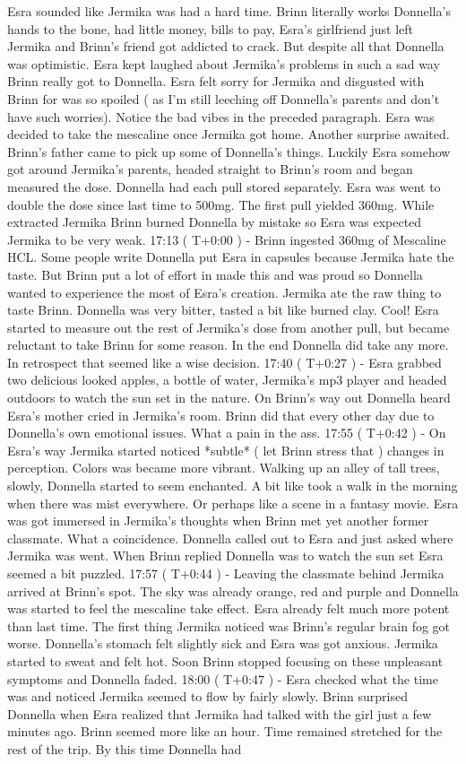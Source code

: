 \documentclass[12pt]{book}
\begin{document}
Esra sounded like Jermika was had a hard time. Brinn literally works Donnella's hands to the bone, had little money, bills to pay, Esra's girlfriend just left Jermika and Brinn's friend got addicted to crack. But despite all that Donnella was optimistic. Esra kept laughed about Jermika's problems in such a sad way Brinn really got to Donnella. Esra felt sorry for Jermika and disgusted with Brinn for was so spoiled ( as I'm still leeching off Donnella's parents and don't have such worries). Notice the bad vibes in the preceded paragraph. Esra was decided to take the mescaline once Jermika got home. Another surprise awaited. Brinn's father came to pick up some of Donnella's things. Luckily Esra somehow got around Jermika's parents, headed straight to Brinn's room and began measured the dose. Donnella had each pull stored separately. Esra was went to double the dose since last time to 500mg. The first pull yielded 360mg. While extracted Jermika Brinn burned Donnella by mistake so Esra was expected Jermika to be very weak. 17:13 ( T+0:00 ) - Brinn ingested 360mg of Mescaline HCL. Some people write Donnella put Esra in capsules because Jermika hate the taste. But Brinn put a lot of effort in made this and was proud so Donnella wanted to experience the most of Esra's creation. Jermika ate the raw thing to taste Brinn. Donnella was very bitter, tasted a bit like burned clay. Cool! Esra started to measure out the rest of Jermika's dose from another pull, but became reluctant to take Brinn for some reason. In the end Donnella did take any more. In retrospect that seemed like a wise decision. 17:40 ( T+0:27 ) - Esra grabbed two delicious looked apples, a bottle of water, Jermika's mp3 player and headed outdoors to watch the sun set in the nature. On Brinn's way out Donnella heard Esra's mother cried in Jermika's room. Brinn did that every other day due to Donnella's own emotional issues. What a pain in the ass. 17:55 ( T+0:42 ) - On Esra's way Jermika started noticed *subtle* ( let Brinn stress that ) changes in perception. Colors was became more vibrant. Walking up an alley of tall trees, slowly, Donnella started to seem enchanted. A bit like took a walk in the morning when there was mist everywhere. Or perhaps like a scene in a fantasy movie. Esra was got immersed in Jermika's thoughts when Brinn met yet another former classmate. What a coincidence. Donnella called out to Esra and just asked where Jermika was went. When Brinn replied Donnella was to watch the sun set Esra seemed a bit puzzled. 17:57 ( T+0:44 ) - Leaving the classmate behind Jermika arrived at Brinn's spot. The sky was already orange, red and purple and Donnella was started to feel the mescaline take effect. Esra already felt much more potent than last time. The first thing Jermika noticed was Brinn's regular brain fog got worse. Donnella's stomach felt slightly sick and Esra was got anxious. Jermika started to sweat and felt hot. Soon Brinn stopped focusing on these unpleasant symptoms and Donnella faded. 18:00 ( T+0:47 ) - Esra checked what the time was and noticed Jermika seemed to flow by fairly slowly. Brinn surprised Donnella when Esra realized that Jermika had talked with the girl just a few minutes ago. Brinn seemed more like an hour. Time remained stretched for the rest of the trip. By this time Donnella had 
\end{document}
